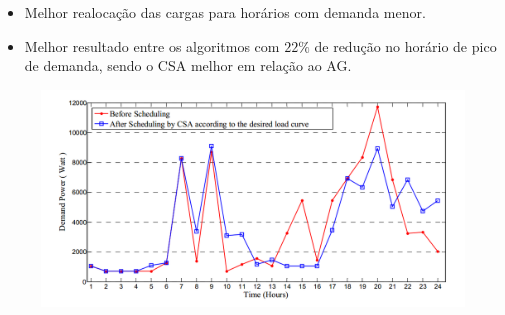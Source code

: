 \begin{frame}
  \begin{block}{}
    \begin{itemize}
        \item Melhor realocação das cargas para horários com demanda menor.
        \item Melhor resultado entre os algoritmos com $22\%$ de redução no
          horário de pico de demanda, sendo o CSA melhor em relação ao AG.
    \end{itemize}
  \end{block}
  \begin{figure}[h]
  	\begin{center}
      \includegraphics [scale=0.3]{./Figures/t01}
  	\end{center}
  \end{figure}
\end{frame}


